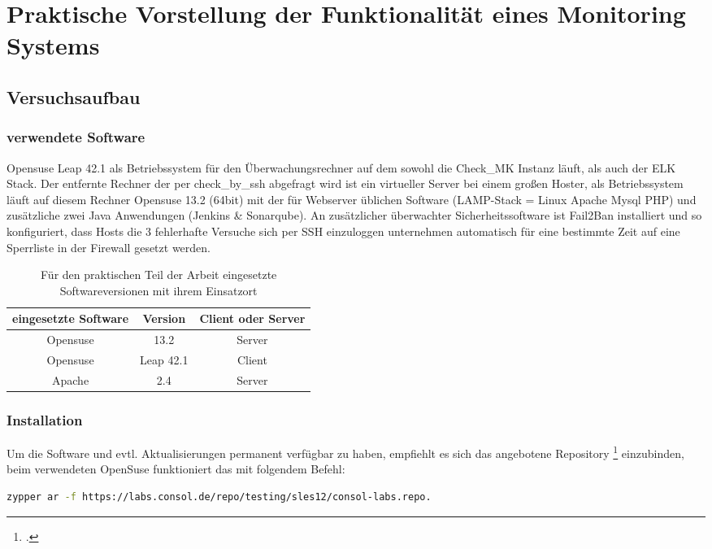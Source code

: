 \documentclass[12pt,a4paper,parskip]{scrreprt}
\begin{document}
	\chapter{Praktische Vorstellung der Funktionalität eines Monitoring Systems}
	\section{Versuchsaufbau}
	\subsection{verwendete Software}
	Opensuse Leap 42.1 als Betriebssystem für den Überwachungsrechner auf dem sowohl die Check\_MK Instanz läuft, als auch der ELK Stack. Der entfernte Rechner der per check\_by\_ssh abgefragt wird ist ein virtueller Server bei einem großen Hoster, als Betriebssystem läuft auf diesem Rechner Opensuse 13.2 (64bit) mit der für Webserver üblichen Software (LAMP-Stack = Linux Apache Mysql PHP) und zusätzliche zwei Java Anwendungen (Jenkins \& Sonarqube). An zusätzlicher überwachter Sicherheitssoftware ist Fail2Ban installiert und so konfiguriert, dass Hosts die 3 fehlerhafte Versuche sich per SSH einzuloggen unternehmen automatisch für eine bestimmte Zeit auf eine Sperrliste in der Firewall gesetzt werden. \\
	\begin{table}[h] %
	\begin{center}
	\begin{tabular}{|c|c|c|}
	\hline 
	eingesetzte Software & Version & Client oder Server \\ 
	\hline 
	Opensuse & 13.2 & Server\\ 
	\hline 
	Opensuse & Leap 42.1 & Client\\
	\hline
	Apache & 2.4 & Server\\
	\hline
	\end{tabular} 
	\caption[Eingesetzte Softwareversionen]{Für den praktischen Teil der Arbeit eingesetzte Softwareversionen mit ihrem Einsatzort}
	\end{center}
	\end{table}
	\subsection{Installation}
	Um die Software und evtl. Aktualisierungen permanent verfügbar zu haben, empfiehlt es sich das angebotene Repository \footcite{omdrepo} einzubinden, beim verwendeten OpenSuse funktioniert das mit folgendem Befehl:
	\begin{lstlisting}[language=bash]
	zypper ar -f https://labs.consol.de/repo/testing/sles12/consol-labs.repo.
	\end{lstlisting}
	
\end{document}
